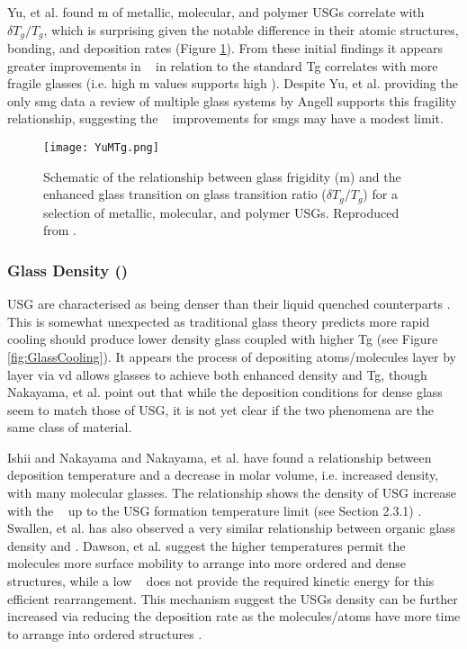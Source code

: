 \documentclass[a4paper,12pt,oneside]{report}%
\begin{document}
Yu, et al. \cite{Yu2013} found m of metallic, molecular, and polymer USGs correlate with $\delta T_{g}/T_{g}$, which is surprising given the notable difference in their atomic structures, bonding, and deposition rates (Figure \ref{fig:YuMTgPlot}). From these initial findings it appears greater improvements in \dTg~ in relation to the standard \gls{Tg} correlates with more fragile glasses (i.e. high m values supports high \dTg). Despite Yu, et al. \cite{Yu2013} providing the only \gls{smg} data a review of multiple glass systems by Angell \cite{Angell2014} supports this fragility relationship, suggesting the \dTg~ improvements for \glspl{smg} may have a modest limit. 

\begin{figure}[htbp]
	\centering
	\texttt{[image: YuMTg.png]}
	\caption[Schematic of the relationship between glass frigidity (m) and the enhanced glass transition on glass transition ratio ($\delta T_{g}/T_{g}$) for a selection of metallic, molecular, and polymer USGs.]{Schematic of the relationship between glass frigidity (m) and the enhanced glass transition on glass transition ratio ($\delta T_{g}/T_{g}$) for a selection of metallic, molecular, and polymer USGs. Reproduced from \cite{Yu2013}.}
	\label{fig:YuMTgPlot}
\end{figure}

\subsubsection{Glass Density (\p)} 
USG are characterised as being denser than their liquid quenched counterparts \cite{Wang2014}. This is somewhat unexpected as traditional glass theory predicts more rapid cooling should produce lower density glass coupled with higher \gls{Tg} (see Figure \ref{fig:GlassCooling}). It appears the process of depositing atoms/molecules layer by layer via \gls{vd} allows glasses to achieve both enhanced density and \gls{Tg}, though Nakayama, et al. \cite{Nakayama2013} point out that while the deposition conditions for dense glass seem to match those of USG, it is not yet clear if the two phenomena are the same class of material.

Ishii and Nakayama \cite{Ishii2014} and Nakayama, et al. \cite{Nakayama2013} have found a relationship between deposition temperature and a decrease in molar volume, i.e. increased density, with many molecular glasses. The relationship shows the density of USG increase with the \Tsub~ up to the USG formation temperature limit (see Section 2.3.1) \cite{Ishii2014, Nakayama2013}. Swallen, et al. \cite{Swallen2007} has also observed a very similar relationship between organic glass density and \Tsub. Dawson, et al. \cite{Dawson2010} suggest the higher temperatures permit the molecules more surface mobility to arrange into more ordered and dense structures, while a low \Tsub~ does not provide the required kinetic energy for this efficient rearrangement. This mechanism suggest the USGs density can be further increased via reducing the deposition rate as the molecules/atoms have more time to arrange into ordered structures \cite{Dawson2010}.
\end{document}
